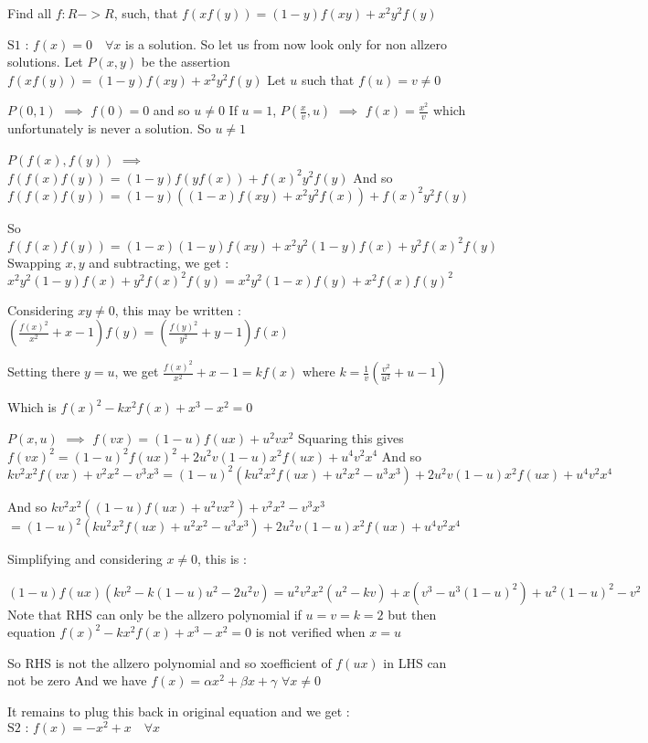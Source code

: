 \begin{solution}
	\begin{tcolorbox}Find all $ f : R -> R$, such, that $ f(xf(y))=(1-y)f(xy)+x^2y^2f(y)$\end{tcolorbox}
$\boxed{\text{S1 : }f(x)=0\quad\forall x}$ is a solution. So let us from now look only for non allzero solutions.
Let $P(x,y)$ be the assertion $f(xf(y))=(1-y)f(xy)+x^2y^2f(y)$
Let $u$ such that $f(u)=v\ne 0$ 

$P(0,1)$ $\implies$ $f(0)=0$ and so $u\ne 0$
If $u=1$, $P(\frac xv,u)$ $\implies$ $f(x)=\frac{x^2}v$ which unfortunately is never a solution.
So $u\ne 1$

$P(f(x),f(y))$ $\implies$ $f(f(x)f(y))=(1-y)f(yf(x))+f(x)^2y^2f(y)$
And so $f(f(x)f(y))=(1-y)((1-x)f(xy)+x^2y^2f(x))+f(x)^2y^2f(y)$

So $f(f(x)f(y))=(1-x)(1-y)f(xy)+x^2y^2(1-y)f(x)+y^2f(x)^2f(y)$
Swapping $x,y$ and subtracting, we get :
$x^2y^2(1-y)f(x)+y^2f(x)^2f(y)=x^2y^2(1-x)f(y)+x^2f(x)f(y)^2$

Considering $xy\ne 0$, this may be written :
$(\frac{f(x)^2}{x^2}+x-1)f(y)=(\frac{f(y)^2}{y^2}+y-1)f(x)$

Setting there $y=u$, we get $\frac{f(x)^2}{x^2}+x-1=kf(x)$ where $k=\frac 1v(\frac{v^2}{u^2}+u-1)$


Which is $f(x)^2-kx^2f(x)+x^3-x^2=0$

$P(x,u)$ $\implies$ $f(vx)=(1-u)f(ux)+u^2vx^2$
Squaring this gives $f(vx)^2=(1-u)^2f(ux)^2+2u^2v(1-u)x^2f(ux)+u^4v^2x^4$
And so $kv^2x^2f(vx)+v^2x^2-v^3x^3=(1-u)^2(ku^2x^2f(ux)+u^2x^2-u^3x^3)+2u^2v(1-u)x^2f(ux)+u^4v^2x^4$

And so $kv^2x^2((1-u)f(ux)+u^2vx^2)+v^2x^2-v^3x^3$ $=(1-u)^2(ku^2x^2f(ux)+u^2x^2-u^3x^3)+2u^2v(1-u)x^2f(ux)+u^4v^2x^4$

Simplifying and considering $x\ne 0$, this is :

$(1-u)f(ux)(kv^2-k(1-u)u^2-2u^2v)=u^2v^2x^2(u^2-kv)+x(v^3-u^3(1-u)^2)+u^2(1-u)^2-v^2$
Note that RHS can only be the allzero polynomial if $u=v=k=2$ but then 
equation $f(x)^2-kx^2f(x)+x^3-x^2=0$ is not verified when $x=u$

So RHS is not the allzero polynomial and so xoefficient of $f(ux)$ in LHS can not be zero
And we have $f(x)=\alpha x^2+\beta x+\gamma$ $\forall x\ne 0$

It remains to plug this back in original equation and we get :
$\boxed{\text{S2 : }f(x)=-x^2+x\quad\forall x}$



\end{solution}



